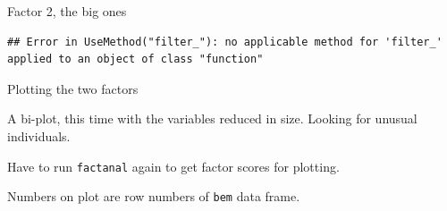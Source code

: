 \documentclass[ignorenonframetext,]{beamer}
\newenvironment{Shaded}{\begin{snugshade}}{\end{snugshade}}
\newcommand{\DataTypeTok}[1]{\textcolor[rgb]{0.13,0.29,0.53}{#1}}
\newcommand{\DecValTok}[1]{\textcolor[rgb]{0.00,0.00,0.81}{#1}}
\newcommand{\FloatTok}[1]{\textcolor[rgb]{0.00,0.00,0.81}{#1}}
\newcommand{\KeywordTok}[1]{\textcolor[rgb]{0.13,0.29,0.53}{\textbf{#1}}}
\newcommand{\NormalTok}[1]{#1}
\newcommand{\OperatorTok}[1]{\textcolor[rgb]{0.81,0.36,0.00}{\textbf{#1}}}
\newcommand{\StringTok}[1]{\textcolor[rgb]{0.31,0.60,0.02}{#1}}
\begin{document}
\begin{frame}[fragile]{Factor 2, the big ones}
\protect\hypertarget{factor-2-the-big-ones}{}

\begin{Shaded}
\end{Shaded}

\begin{verbatim}
## Error in UseMethod("filter_"): no applicable method for 'filter_' applied to an object of class "function"
\end{verbatim}

\end{frame}

\begin{frame}[fragile]{Plotting the two factors}
\protect\hypertarget{plotting-the-two-factors}{}

A bi-plot, this time with the variables reduced in size. Looking for
unusual individuals.

Have to run \texttt{factanal} again to get factor scores for plotting.

\begin{Shaded}
\end{Shaded}

Numbers on plot are row numbers of \texttt{bem} data frame.

\end{frame}
\end{document}
